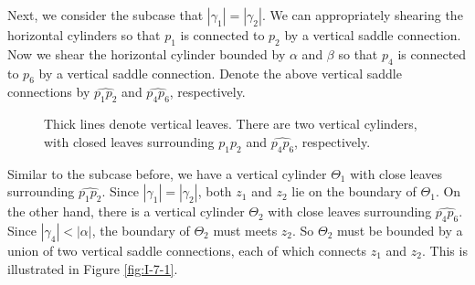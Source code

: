 \documentclass[11pt]{amsart}
\theoremstyle{plain}
\begin{document}
Next, we consider the subcase that $|\gamma_1|= |\gamma_2|$. We can  appropriately shearing the horizontal cylinders so that $p_1$ is connected to
$p_2$ by a vertical saddle connection.
Now we shear the horizontal cylinder bounded by $\alpha$ and $\beta$ so that $p_4$ is connected to
$p_6$ by a vertical saddle connection. Denote the above vertical saddle connections by $\widehat{p_1p_2}$ and $\widehat{p_4p_6}$, respectively. 



\begin{figure}[h]
    \centering

\caption{Thick lines denote vertical leaves. There are two vertical cylinders, with closed leaves surrounding $\widehat{p_1p_2}$ and $\widehat{p_4p_6}$, respectively. }
       \label{fig:I-7-3} 
\end{figure}





Similar to the subcase before, we 
have a vertical cylinder $\Theta_1$ with close leaves surrounding $\widehat{p_1p_2}$. Since $|\gamma_1|= |\gamma_2|$, both $z_1$ and $z_2$ lie on the boundary of $\Theta_1$.
On the other hand, there is a vertical cylinder $\Theta_2$ with close leaves surrounding $\widehat{p_4p_6}$. Since $|\gamma_4|< |\alpha|$, the boundary of $\Theta_2$ must meets $z_2$.
So  $\Theta_2$ must be bounded by a union of two vertical saddle connections, each of which connects $z_1$ and $z_2$. 
This is illustrated in Figure \ref{fig:I-7-1}. 
\end{document}
